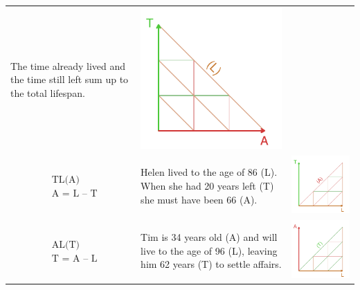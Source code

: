 \documentclass[12pt,oneside,a4paper,doublespacing]{article} %
\theoremstyle{definition}
\begin{document}
\begin{longtable}{m{}L{0.5\textwidth}C{0.2\textwidth}}
  The time already lived and the time still left sum up to the total lifespan. &
  \includegraphics[scale=.5]{TA_rt.pdf}   
  \\
  $$\begin{aligned}
    &\text{TL(A)} \\
    &\text{A = L -- T}
  \end{aligned}$$ &
  Helen lived to the age of 86 (L). When she had 20 years left (T) she must have been 66 (A). &
  \includegraphics[scale=.5]{TL_rt.pdf}   
 \\
  $$\begin{aligned}
    &\text{AL(T)} \\
    &\text{T = A -- L}
  \end{aligned}$$ &
  Tim is 34 years old (A) and will live to the age of 96 (L), leaving him 62 years (T) to settle affairs. &
  \includegraphics[scale=.5]{AL_rt.pdf} 

\end{longtable}
\end{document}
